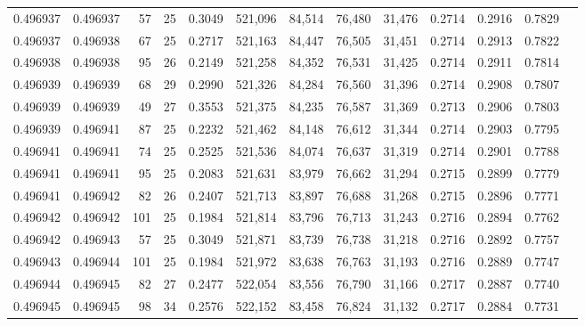 \begin{tabular}{rrrrrrrrrrrrr}
0.496937 & 0.496937 &  57 &  25 &                                     0.3049 & 521,096 &  84,514 &  76,480 &  31,476 & 0.2714 & 0.2916 & 0.7829 \\
0.496937 & 0.496938 &  67 &  25 &                                     0.2717 & 521,163 &  84,447 &  76,505 &  31,451 & 0.2714 & 0.2913 & 0.7822 \\
0.496938 & 0.496938 &  95 &  26 &                                     0.2149 & 521,258 &  84,352 &  76,531 &  31,425 & 0.2714 & 0.2911 & 0.7814 \\
0.496939 & 0.496939 &  68 &  29 &                                     0.2990 & 521,326 &  84,284 &  76,560 &  31,396 & 0.2714 & 0.2908 & 0.7807 \\
0.496939 & 0.496939 &  49 &  27 &                                     0.3553 & 521,375 &  84,235 &  76,587 &  31,369 & 0.2713 & 0.2906 & 0.7803 \\
0.496939 & 0.496941 &  87 &  25 &                                     0.2232 & 521,462 &  84,148 &  76,612 &  31,344 & 0.2714 & 0.2903 & 0.7795 \\
0.496941 & 0.496941 &  74 &  25 &                                     0.2525 & 521,536 &  84,074 &  76,637 &  31,319 & 0.2714 & 0.2901 & 0.7788 \\
0.496941 & 0.496941 &  95 &  25 &                                     0.2083 & 521,631 &  83,979 &  76,662 &  31,294 & 0.2715 & 0.2899 & 0.7779 \\
0.496941 & 0.496942 &  82 &  26 &                                     0.2407 & 521,713 &  83,897 &  76,688 &  31,268 & 0.2715 & 0.2896 & 0.7771 \\
0.496942 & 0.496942 & 101 &  25 &                                     0.1984 & 521,814 &  83,796 &  76,713 &  31,243 & 0.2716 & 0.2894 & 0.7762 \\
0.496942 & 0.496943 &  57 &  25 &                                     0.3049 & 521,871 &  83,739 &  76,738 &  31,218 & 0.2716 & 0.2892 & 0.7757 \\
0.496943 & 0.496944 & 101 &  25 &                                     0.1984 & 521,972 &  83,638 &  76,763 &  31,193 & 0.2716 & 0.2889 & 0.7747 \\
0.496944 & 0.496945 &  82 &  27 &                                     0.2477 & 522,054 &  83,556 &  76,790 &  31,166 & 0.2717 & 0.2887 & 0.7740 \\
0.496945 & 0.496945 &  98 &  34 &                                     0.2576 & 522,152 &  83,458 &  76,824 &  31,132 & 0.2717 & 0.2884 & 0.7731 \\

\end{tabular}
